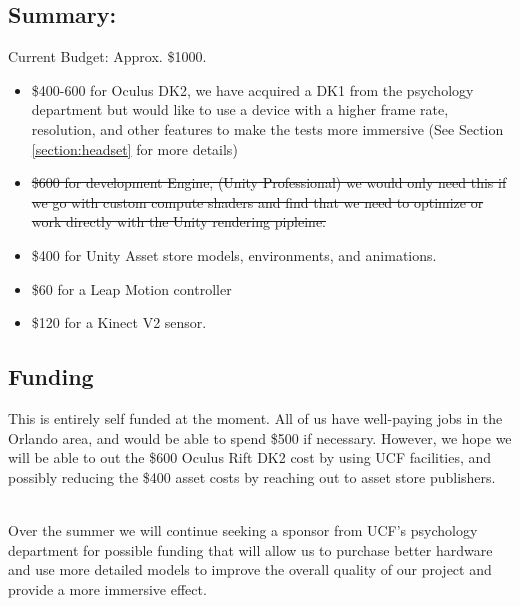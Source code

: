\documentclass[a4paper,10pt]{article}
\begin{document}
\subsection{Summary:}
Current Budget: Approx. \$1000.  
\begin{itemize}
	\item \$400-600 for Oculus DK2, we have acquired a DK1 from the psychology department but would like to use a device with a higher frame rate, resolution, and other features to make the tests more immersive (See Section \ref{section:headset} for more details)
	\item  \st{\$600 for development Engine, (Unity Professional) we would only need this if we go with custom compute shaders and find that we need to optimize or work directly with the Unity rendering pipleine.}
	\item	\$400 for Unity Asset store models, environments, and animations.
	\item  \$60 for a Leap Motion controller
	\item  \$120 for a Kinect V2 sensor. 
\end{itemize}

\subsection{Funding}
This is entirely self funded at the moment.  All of us have well-paying jobs in the Orlando area, and would be able to spend \$500 if necessary.  However, we hope we will be able to out the \$600 Oculus Rift DK2 cost by using UCF facilities, and possibly reducing the \$400 asset costs by reaching out to asset store publishers.

~\\ Over the summer we will continue seeking a sponsor from UCF's psychology department for possible funding that will allow us to purchase better hardware and use more detailed models to improve the overall quality of our project and provide a more immersive effect.
			    
			    
\end{document}
